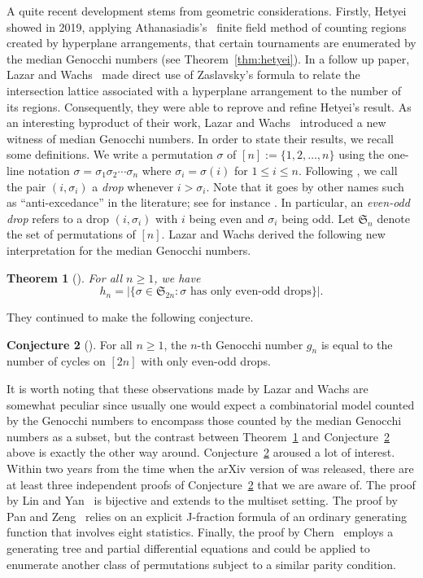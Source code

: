 \documentclass[11pt,reqno]{amsart}
\numberwithin{equation}{section}
\theoremstyle{plain}
\newtheorem{theorem}{Theorem}[section]
\theoremstyle{definition}
\newtheorem{conj}[theorem]{Conjecture}
\renewcommand{\S}{\mathfrak{S}}
\begin{document}
A quite recent development stems from geometric considerations. Firstly, Hetyei~\cite{het19} showed in 2019, applying Athanasiadis's~\cite{ath96} finite field method of counting regions created by hyperplane arrangements, that certain tournaments are enumerated by the median Genocchi numbers (see Theorem~\ref{thm:hetyei}). In a follow up paper, Lazar and Wachs~\cite{LW22} made direct use of Zaslavsky's formula to relate the intersection lattice associated with a hyperplane arrangement to the number of its regions. Consequently, they were able to reprove and refine Hetyei's result. As an interesting byproduct of their work, Lazar and Wachs~\cite{LW22} introduced a new witness of median Genocchi numbers. In order to state their results, we recall some definitions. We write a permutation $\sigma$ of $[n]:=\{1,2,\ldots,n\}$ using the one-line notation $\sigma=\sigma_1\sigma_2\cdots\sigma_n$ where $\sigma_i=\sigma(i)$ for $1\le i\le n$. Following \cite{LW22}, we call the pair $(i,\sigma_i)$ a {\it drop} whenever $i>\sigma_i$. Note that it goes by other names such as ``anti-excedance'' in the literature; see for instance \cite{SZ22}. In particular, an {\it even-odd drop} refers to a drop $(i,\sigma_i)$ with $i$ being even and $\sigma_i$ being odd. Let $\S_n$ denote the set of permutations of $[n]$. Lazar and Wachs derived the following new interpretation for the median Genocchi numbers.
\begin{theorem}[{\cite[Coro.~6.2]{LW22}}]\label{thm:Lazar-Wachs}
For all $n\ge 1$, we have 
$$h_n=|\{\sigma\in\S_{2n}: \text{$\sigma$ has only even-odd drops}\}|.$$
\end{theorem}
They continued to make the following conjecture.
\begin{conj}[{\cite[Conj.~6.4]{LW22}}]\label{conj:Lazar-Wachs}
For all $n\ge 1$, the $n$-th Genocchi number $g_n$ is equal to the number of cycles on $[2n]$ with only even-odd drops.
\end{conj}

It is worth noting that these observations made by Lazar and Wachs are somewhat peculiar since usually one would expect a combinatorial model counted by the Genocchi numbers to encompass those counted by the median Genocchi numbers as a subset, but the contrast between Theorem~\ref{thm:Lazar-Wachs} and Conjecture~\ref{conj:Lazar-Wachs} above is exactly the other way around. Conjecture~\ref{conj:Lazar-Wachs} aroused a lot of interest. Within two years from the time when the arXiv version of \cite{LW22} was released, there are at least three independent proofs of Conjecture~\ref{conj:Lazar-Wachs} that we are aware of. The proof by Lin and Yan~\cite{LY22} is bijective and extends to the multiset setting. The proof by Pan and Zeng~\cite{PZ23} relies on an explicit J-fraction formula of an ordinary generating function that involves eight statistics. Finally, the proof by Chern~\cite{che23} employs a generating tree and partial differential equations and could be applied to enumerate another class of permutations subject to a similar parity condition.
\end{document}
